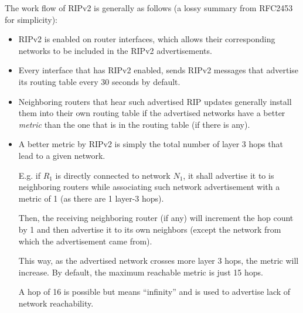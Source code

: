 \documentclass[pdftex,12pt,a4paper]{article}
\begin{document}
        The work flow of RIPv2 is generally as follows (a lossy summary from
        RFC2453 for simplicity):
        \begin{itemize}
            \item RIPv2 is enabled on router interfaces, which allows their
                corresponding networks to be included in the RIPv2
                advertisements.
            \item Every interface that has RIPv2 enabled, sends RIPv2 messages
                that advertise its routing table every 30 seconds by default.
            \item Neighboring routers that hear such advertised
                RIP updates generally install them into their own routing table
                if the advertised networks have a better \emph{metric} than the
                one that is in the routing table (if there is any).
            \item A better metric by RIPv2 is simply the total number of layer
                3 hops that lead to a given network. 
                
                E.g. if $R_1$ is directly connected to network $N_1$, it shall
                advertise it to is neighboring routers while associating such
                network advertisement with a metric of 1 (as there are 1
                layer-3 hops). 
                
                Then, the receiving neighboring router (if any) will increment the hop
                count by 1 and then advertise it to its own neighbors (except
                the network from which the advertisement came from).

                This way, as the advertised network crosses more layer 3 hops,
                the metric will increase. By default, the maximum reachable metric is just
                15 hops. 
                
                A hop of 16 is possible but means ``infinity'' and is used to
                advertise lack of network reachability.
        \end{itemize}
\end{document}
